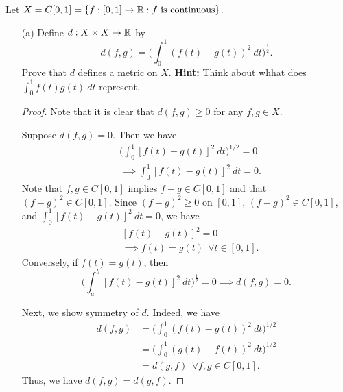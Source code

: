 \documentclass[a4paper]{article}
\begin{document}
\begin{problem}
    Let \( X = C[0,1]  = \{ f: [0,1] \to \R : f \ \text{is continuous} \} \).
\end{problem}
\begin{enumerate}
    \item[(a)] Define \( d: X \times X \to \mathbb{R}  \) by
        \[  d(f,g) = \Big(  \int_{ 0 }^{ 1 }  (f(t) - g(t))^{2} \ dt  \Big)^{\frac{ 1 }{ 2 }}.  \]
        Prove that \( d  \) defines a metric on \( X  \). \textbf{Hint:} Think about whhat does \( \displaystyle \int_{ 0 }^{ 1 }  f(t) g(t) \ d t   \) represent.
        \begin{proof}
            Note that it is clear that \( d(f,g) \geq 0  \) for any \( f,g \in X  \). 

            Suppose \( d(f,g) = 0  \). Then we have
            \begin{align*}
                &\Big(  \int_{ 0  }^{  1  }  [f(t) - g(t)]^{2} \ dt  \Big)^{1/2} = 0  \\
                &\implies \int_{ 0 }^{ 1 }  [f(t)-g(t)]^{2} \ dt = 0. 
            \end{align*}
            Note that \( f,g \in C[0,1] \) implies \( f - g \in C[0,1] \) and that \( (f-g)^{2} \in C[0,1] \). Since \( (f-g)^{2} \geq 0  \) on \( [0,1] \), \( (f-g)^{2} \in C[0,1] \), and \( \displaystyle \int_{ 0 }^{ 1 }  [f(t) - g(t)]^{2} \ dt = 0 \), we have 
            \begin{align*}
                &[f(t) - g(t)]^{2} = 0  \\
                &\implies f(t) = g(t) \ \ \forall t \in [0,1].
            \end{align*}
            Conversely, if \( f(t) = g(t) \), then 
            \[  \Big(  \int_{ a }^{ b }  [f(t) - g(t)]^{2} \ dt \Big)^{\frac{ 1 }{ 2 }} = 0 \implies d(f,g) = 0.  \]

            Next, we show symmetry of \( d  \). Indeed, we have  
            \begin{align*}
                d(f,g) &= \Big(  \int_{ 0 }^{ 1 }  (f(t) - g(t))^{2} \ dt  \Big)^{1/2} \\
                       &= \Big(  \int_{ 0 }^{ 1 } (g(t) - f(t))^{2} \ dt  \Big)^{1/2} \\
                       &= d(g,f) \ \ \forall f,g \in C[0,1].
            \end{align*}
            Thus, we have \( d(f,g) = d(g,f) \).


\end{proof}
\end{enumerate}
\end{document}
